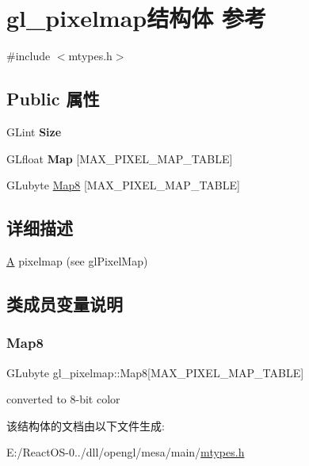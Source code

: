 \hypertarget{structgl__pixelmap}{}\section{gl\+\_\+pixelmap结构体 参考}
\label{structgl__pixelmap}


{\ttfamily \#include $<$mtypes.\+h$>$}

\subsection*{Public 属性}
\begin{DoxyCompactItemize}
\item 
\mbox{\label{structgl__pixelmap_a0b95741875fa03088745f921b965ab70}} 
G\+Lint {\bfseries Size}
\item 
\mbox{\label{structgl__pixelmap_a6fb376058153732cf312bd9775cf1672}} 
G\+Lfloat {\bfseries Map} \mbox{[}M\+A\+X\+\_\+\+P\+I\+X\+E\+L\+\_\+\+M\+A\+P\+\_\+\+T\+A\+B\+LE\mbox{]}
\item 
G\+Lubyte \hyperlink{structgl__pixelmap_ab71d9306fd8fda0027bd95c868045039}{Map8} \mbox{[}M\+A\+X\+\_\+\+P\+I\+X\+E\+L\+\_\+\+M\+A\+P\+\_\+\+T\+A\+B\+LE\mbox{]}
\end{DoxyCompactItemize}


\subsection{详细描述}
\hyperlink{struct_a}{A} pixelmap (see gl\+Pixel\+Map) 

\subsection{类成员变量说明}
\mbox{\label{structgl__pixelmap_ab71d9306fd8fda0027bd95c868045039}} 
\subsubsection{\texorpdfstring{Map8}{Map8}}
{\footnotesize\ttfamily G\+Lubyte gl\+\_\+pixelmap\+::\+Map8\mbox{[}M\+A\+X\+\_\+\+P\+I\+X\+E\+L\+\_\+\+M\+A\+P\+\_\+\+T\+A\+B\+LE\mbox{]}}

converted to 8-\/bit color 

该结构体的文档由以下文件生成\+:\begin{DoxyCompactItemize}
\item 
E\+:/\+React\+O\+S-\/0../dll/opengl/mesa/main/\hyperlink{mtypes_8h}{mtypes.\+h}\end{DoxyCompactItemize}
